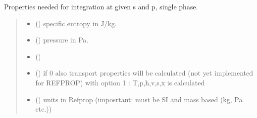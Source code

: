 \documentclass[letterpaper,10pt,english]{sphinxmanual}
\begin{document}
\begin{fulllineitems}
\label{\detokenize{fluid_properties_rp:fluid_properties_rp.sp}}
\pysigstartsignatures
{}
\pysigstopsignatures
\sphinxAtStartPar
Properties needed for integration at given s and p, single phase.
\begin{quote}\begin{description}
\begin{itemize}
\item {} 
\sphinxAtStartPar
{} () \textendash{} specific entropy in J/kg.

\item {} 
\sphinxAtStartPar
{} () \textendash{} pressure in Pa.

\item {} 
\sphinxAtStartPar
{} () \textendash{} 

\item {} 
\sphinxAtStartPar
{} () \textendash{} if 0 also transport properties will be calculated
(not yet implemented for REFPROP)
with option 1 : T,p,h,v,s,x is calculated

\item {} 
\sphinxAtStartPar
{} () \textendash{} units in Refprop (imposrtant: must be SI and mass based (kg, Pa etc.))

\end{itemize}

\sphinxAtStartPar


\end{description}
\end{quote}
\end{fulllineitems}
\end{document}
